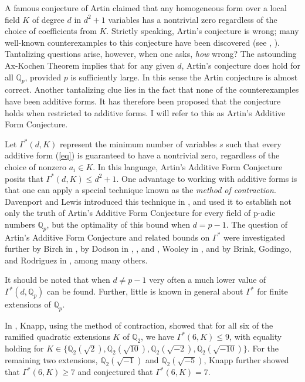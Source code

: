 \documentclass{article}
\begin{document}
A famous conjecture of Artin claimed that any homogeneous form over a local field $K$ of degree $d$ in $d^2+1$ variables has a nontrivial zero regardless of the choice of coefficients from $K$.  Strictly speaking, Artin's conjecture is wrong; many well-known counterexamples to this conjecture have been discovered (see \cite{MR197450}, \cite{greenberg1969lectures}).   Tantalizing questions arise, however, when one asks, \textit{how} wrong?  The astounding Ax-Kochen Theorem implies that for any given $d$, Artin's conjecture does hold for all $\mathbb{Q}_p$, provided $p$ is sufficiently large.  In this sense the Artin conjecture is almost correct.  Another tantalizing clue lies in the fact that none of the counterexamples have been additive forms.  It has therefore been proposed that the conjecture holds when restricted to additive forms.  I will refer to this as Artin's Additive Form Conjecture.

Let $\Gamma^*(d, K)$ represent the minimum number of variables $s$ such that every additive form (\ref{eq}) is guaranteed to have a nontrivial zero, regardless of the choice of nonzero $a_i \in K$.  In this language, Artin's Additive Form Conjecture posits that $\Gamma^*(d, K) \le d^2+1$. One advantage to working with additive forms is that one can apply a special technique known as the \textit{method of contraction}.  Davenport and Lewis introduced this technique in \cite{davenport1963homogeneous}, and used it to establish not only the truth of Artin's Additive Form Conjecture for every field of p-adic numbers $\mathbb{Q}_p$, but the optimality of this bound when $d=p-1$.  The question of Artin's Additive Form Conjecture and related bounds on $\Gamma^*$ were investigated further by Birch in \cite{birchdiagonal_MR167456}, by Dodson in \cite{dodson1_MR213296}, \cite{dodson2_MR382139}, and \cite{dodson3_MR649113}, Wooley in \cite{wooley_MR3365797}, and by Brink, Godingo, and Rodriguez in \cite{godinho_MR2413361}, among many others.


It should be noted that when $d \ne p-1$ very often a much lower value of $\Gamma^*(d, \mathbb{Q}_p)$ can be found.  Further, little is known in general about $\Gamma^*$ for finite extensions of $\mathbb{Q}_p$.

In \cite{knapp2016solubility}, Knapp, using the method of contraction, showed that for all six of the ramified quadratic extensions $K$ of $\mathbb{Q}_2$, we have $\Gamma^*(6,K) \le 9$, with equality holding for $K \in \{\mathbb{Q}_2(\sqrt{2}), \mathbb{Q}_2(\sqrt{10}), \mathbb{Q}_2(\sqrt{-2}), \mathbb{Q}_2(\sqrt{-10})\}$.  For the remaining two extensions, $\mathbb{Q}_2(\sqrt{-1})$ and $\mathbb{Q}_2(\sqrt{-5})$, Knapp further showed that $\Gamma^*(6,K) \ge 7$ and conjectured that $\Gamma^*(6,K) = 7$.
\end{document}

